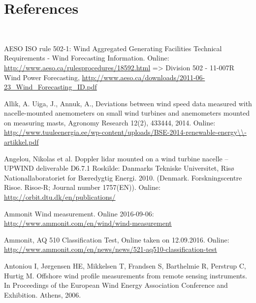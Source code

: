 \chapter*{References}\label{references}
\setlength{\parindent}{-1cm}\\

\noindent

AESO ISO rule 502-1: Wind Aggregated Generating Facilities Technical Requirements - Wind Forecasting Information. Online: \small{\url{http://www.aeso.ca/rulesprocedures/18592.html}} => Division 502 - 11-007R Wind Power Forecasting, \small{\url{http://www.aeso.ca/downloads/2011-06-23_Wind_Forecasting_ID.pdf}}

Allik, A. Uiga, J., Annuk, A.,  Deviations between wind speed data measured with nacelle-mounted anemometers on small wind turbines and anemometers mounted on measuring masts, Agronomy Research 12(2), 433­444, 2014.                      
Online: \small{\url{http://www.tuuleenergia.ee/wp-content/uploads/BSE-2014-renewable-energy\\-artikkel.pdf}}


Angelou, Nikolas et al. Doppler lidar mounted on a wind turbine nacelle – UPWIND deliverable D6.7.1 Roskilde: Danmarks Tekniske Universitet, Risø Nationallaboratoriet for Bæredygtig Energi. 2010. (Denmark. Forskningscentre Risoe. Risoe-R; Journal number 1757(EN)). 
Online: \small{\url{http://orbit.dtu.dk/en/publications/}}


Ammonit Wind measurement. Online 2016-09-06:\\                          
\small{\url{http://www.ammonit.com/en/wind/wind-measurement}}


Ammonit, AQ 510 Classification Test, Online taken on 12.09.2016. Online: \small{\url{http://www.ammonit.com/en/news/news/521-aq510-classification-test}}


Antoniou I, Jørgensen HE, Mikkelsen T, Frandsen S, Barthelmie R, Perstrup C, Hurtig M. Offshore wind profile measurements from remote sensing instruments. In Proceedings of the European Wind Energy Association Conference and Exhibition. Athens, 2006.


